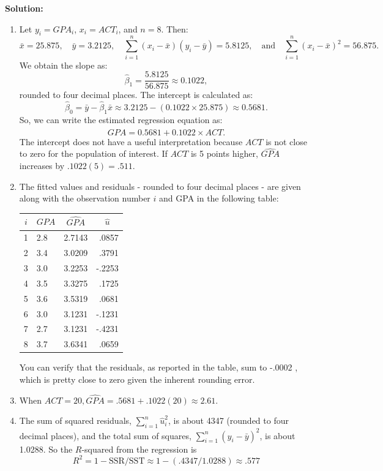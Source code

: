 \documentclass[12pt]{article}
\begin{document}
\begin{enumerate}
{\color{blue}
\noindent \textbf{Solution:}

\begin{enumerate}
    \item Let \( y_i = GPA_i \), \( x_i = ACT_i \), and \( n = 8 \). Then:
\[
\bar{x} = 25.875, \quad \bar{y} = 3.2125, \quad \sum_{i=1}^n \left( x_i - \bar{x} \right) \left( y_i - \bar{y} \right) = 5.8125, \quad \text{and} \quad \sum_{i=1}^n \left( x_i - \bar{x} \right)^2 = 56.875.
\]
We obtain the slope as:
\[
\hat{\beta}_1 = \frac{5.8125}{56.875} \approx 0.1022,
\]
rounded to four decimal places.
The intercept is calculated as:
\[
\hat{\beta}_0 = \bar{y} - \hat{\beta}_1 \bar{x} \approx 3.2125 - (0.1022 \times 25.875) \approx 0.5681.
\]
So, we can write the estimated regression equation as:
\[
\widehat{GPA} = 0.5681 + 0.1022 \times ACT.
\]
The intercept does not have a useful interpretation because $A C T$ is not close to zero for the population of interest. If $A C T$ is 5 points higher, $\widehat{G P A}$ increases by $.1022(5)=.511$.

\item The fitted values and residuals - rounded to four decimal places - are given along with the observation number $i$ and GPA in the following table:
\begin{center}
\begin{tabular}{|c|l|c|r|}
\hline$i$ & $G P A$ & $\widehat{G P A}$ & \multicolumn{1}{c|}{$\hat{u}$} \\
\hline 1 & 2.8 & 2.7143 & .0857 \\
2 & 3.4 & 3.0209 & .3791 \\
3 & 3.0 & 3.2253 & -.2253 \\
4 & 3.5 & 3.3275 & .1725 \\
5 & 3.6 & 3.5319 & .0681 \\
6 & 3.0 & 3.1231 & -.1231 \\
7 & 2.7 & 3.1231 & -.4231 \\
8 & 3.7 & 3.6341 & .0659 \\
\hline
\end{tabular}
\end{center}
You can verify that the residuals, as reported in the table, sum to -.0002 , which is pretty close to zero given the inherent rounding error.

\item When $A C T=20, \widehat{G P A}=.5681+.1022(20) \approx 2.61$.

\item The sum of squared residuals, $\sum_{i=1}^n \hat{u}_i^2$, is about 4347 (rounded to four decimal places), and the total sum of squares, $\sum_{i=1}^n\left(y_i-\bar{y}\right)^2$, is about 1.0288. So the $R$-squared from the regression is
$$
R^2=1-\mathrm{SSR} / \mathrm{SST} \approx 1-(.4347 / 1.0288) \approx .577
$$



\end{enumerate}}
\end{enumerate}
\end{document}
